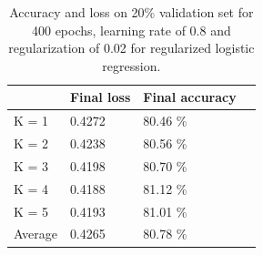 \documentclass[10pt,conference,compsocconf]{IEEEtran}
\begin{document}
\begin{table}[htbp]
  \centering
  \begin{tabular}[c]{|l||l|l|l|}
    \hline
    &Final loss&Final accuracy \\
    \hline
    K = 1 & 0.4272 & 80.46 \% \\
    K = 2 &0.4238 & 80.56 \%\\
    K = 3 &0.4198 & 80.70 \%\\
    K = 4 &0.4188 & 81.12 \%\\
    K = 5 & 0.4193 & 81.01 \%\\
     \hline
    Average & 0.4265 & 80.78 \% \\
    \hline
  \end{tabular}
  \caption{Accuracy and loss on 20\% validation set for 400 epochs, learning rate of 0.8 and regularization of 0.02 for regularized logistic regression. }
  \label{tab:result_log_reg}
\end{table}




\end{document}
